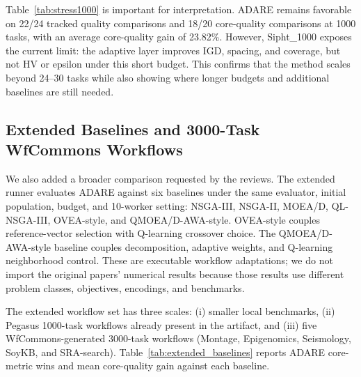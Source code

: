 \documentclass[runningheads]{llncs}
\begin{document}
Table~\ref{tab:stress1000} is important for interpretation. ADARE remains favorable on 22/24 tracked quality comparisons and 18/20 core-quality comparisons at 1000 tasks, with an average core-quality gain of 23.82\%. However, Sipht\_1000 exposes the current limit: the adaptive layer improves IGD, spacing, and coverage, but not HV or epsilon under this short budget. This confirms that the method scales beyond 24--30 tasks while also showing where longer budgets and additional baselines are still needed.

\subsection{Extended Baselines and 3000-Task WfCommons Workflows}
We also added a broader comparison requested by the reviews. The extended runner evaluates ADARE against six baselines under the same evaluator, initial population, budget, and 10-worker setting: NSGA-III, NSGA-II, MOEA/D, QL-NSGA-III, OVEA-style, and QMOEA/D-AWA-style. OVEA-style couples reference-vector selection with Q-learning crossover choice. The QMOEA/D-AWA-style baseline couples decomposition, adaptive weights, and Q-learning neighborhood control. These are executable workflow adaptations; we do not import the original papers' numerical results because those results use different problem classes, objectives, encodings, and benchmarks.

The extended workflow set has three scales: (i) smaller local benchmarks, (ii) Pegasus 1000-task workflows already present in the artifact, and (iii) five WfCommons-generated 3000-task workflows (Montage, Epigenomics, Seismology, SoyKB, and SRA-search). Table~\ref{tab:extended_baselines} reports ADARE core-metric wins and mean core-quality gain against each baseline.
\end{document}
